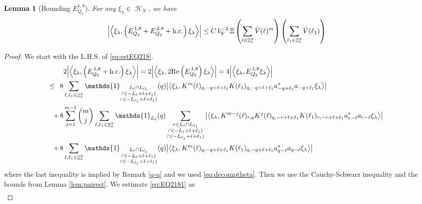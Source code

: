 \documentclass[12pt,a4paper]{article}
\numberwithin{equation}{section}
\newcommand{\1}{\mathbb{I}}
\newcommand{\F}{\mathrm{F}}
\DeclareMathOperator{\Z}{\mathbb{Z}}
\DeclareMathOperator{\HH}{\mathcal{H}}
\newcommand{\eva}[1]{\left\langle #1 \right\rangle}
\theoremstyle{plain}
\newtheorem{lemma}[theorem]{Lemma}
\theoremstyle{definition}
\theoremstyle{remark}
\theoremstyle{plain}
\theoremstyle{definition}
\theoremstyle{remark}
\begin{document}
\begin{lemma}[Bounding $E_{Q_2}^{1,8}$]\label{lem:EQ218}
	For any $\xi_\lambda \in \HH_N$, we have
	\begin{alignat}{2}
		\abs{\eva{\xi_\lambda,\left(E^{\,1,8}_{Q_2}+E^{\,2,8}_{Q_2}+\mathrm{h.c.}\right) \xi_\lambda }}
		\leq  C\, k_{\F}^{-2}\, \Xi \left(\sum\limits_{\ell \in \Z^3_*} \hat{V}(\ell)^m \right) \left(\sum\limits_{\ell_1 \in \Z^3_*} \hat{V}(\ell_1) \right) \label{eq:estEQ218}  
	\end{alignat}
\end{lemma}
\begin{proof}
 We start with the L.H.S. of \eqref{eq:estEQ218}.
\begin{align}
	&2\abs{\eva{\xi_\lambda,\left(E^{\,1,8}_{Q_2}+\mathrm{h.c.}\right) \xi_\lambda }} = 2\abs{\eva{\xi_\lambda,2\mathrm{Re}\left(E^{\,1,8}_{Q_2}\right) \xi_\lambda }} = 4\abs{\eva{\xi_\lambda, E^{\,1,8}_{Q_2} \xi_\lambda }}\nonumber\\
	\leq\,\;8& \sum\limits_{\ell, \ell_1\in \Z^3_*} \mathds{1}_{\substack{L_{\ell}\cap L_{\ell_1}\\\cap (-L_{\ell}+\ell+\ell_1) \\ \cap (-L_{\ell_1}+\ell+\ell_1)}}(q) \abs{\eva{\xi_\lambda, K^m(\ell)_{q,-q+\ell+\ell_1} K(\ell_1)_{q,-q+\ell+\ell_1} a^*_{-q+\ell_1}a_{-q+\ell_1} \xi_\lambda }} \label{eq:EQ2181}\\
	+\,8& \sum\limits_{j=1}^{m-1} {{m}\choose j} \sum\limits_{\ell, \ell_1\in \Z^3_*}\mathds{1}_{L_{\ell}}(q) \sum\limits_{\substack{r\in L_{\ell} \cap L_{\ell_1}\\\cap (-L_{\ell}+\ell+\ell_1) \\ \cap (-L_{\ell_1}+\ell+\ell_1)}}  \abs{\eva{\xi_\lambda, K^{m-j}(\ell)_{r,q} K^j(\ell)_{q,-r+\ell+\ell_1} K(\ell_1)_{r,-r+\ell+\ell_1} a^*_{r-\ell}a_{r-\ell} \xi_\lambda }} \label{eq:EQ2182}\\
	+\,8&\sum\limits_{\ell, \ell_1\in \Z^3_*} \mathds{1}_{\substack{L_{\ell}\cap L_{\ell_1}\\\cap (-L_{\ell}+\ell+\ell_1) \\ \cap (-L_{\ell_1}+\ell+\ell_1)}} (q) \abs{\eva{\xi_\lambda, K^m(\ell)_{q,-q+\ell+\ell_1}K(\ell_1)_{q,-q+\ell+\ell_1} a^*_{q-\ell}a_{q-\ell}\xi_\lambda }} \label{eq:EQ2183}
\end{align}
where the last inequality is implied by Remark \ref{q-q} and we used \eqref{eq:decomptheta}. Then we use the Cauchy-Schwarz inequality and the bounds from Lemma \ref{lem:pairest}.
We estimate \eqref{eq:EQ2181} as 
\begin{align}

\end{align}
\end{proof}
\end{document}
